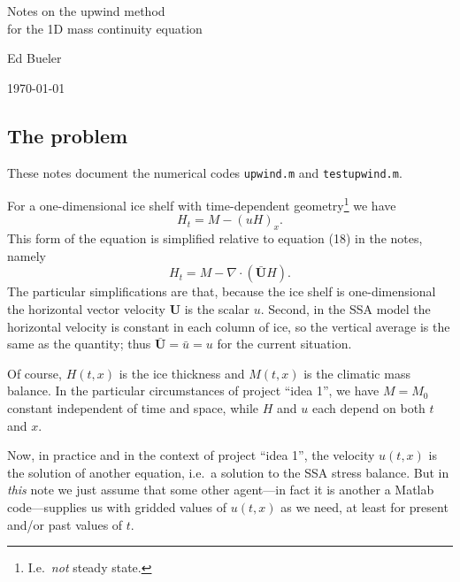 \documentclass[titlepage,a4paper,final,12pt]{scrartcl}
\newcommand{\Div}{\nabla\cdot}
\begin{document}


\begin{titlepage}

  \begin{center}
    \vspace{10cm}
    {\Large{} Notes on the upwind method \\ for the 1D mass continuity equation}
    \vspace{5cm}

    {\large Ed Bueler}

    \vspace{10cm}
    {\large \today}
  \end{center}
\end{titlepage}


\subsection*{The problem}   These notes document the numerical codes \texttt{upwind.m} and \texttt{testupwind.m}.

For a one-dimensional ice shelf with time-dependent geometry\footnote{I.e.~\emph{not} steady state.} we have
\begin{equation}
  H_t = M - (u H)_x.  \label{mc}
\end{equation}
This form of the equation is simplified relative to equation (18) in the notes, namely
    $$H_t = M - \Div \left(\bar{\mathbf{U}} H\right).$$
The particular simplifications are that, because the ice shelf is one-dimensional the horizontal vector velocity $\mathbf{U}$ is the scalar $u$.  Second, in the SSA model the horizontal velocity is constant in each column of ice, so the vertical average is the same as the quantity; thus $\bar{\mathbf{U}} = \bar{u} = u$ for the current situation.

Of course, $H(t,x)$ is the ice thickness and $M(t,x)$ is the climatic mass balance.  In the particular circumstances of project ``idea 1'', we have $M=M_0$ constant independent of time and space, while $H$ and $u$ each depend on both $t$ and $x$.

Now, in practice and in the context of project ``idea 1'', the velocity $u(t,x)$ is the solution of another equation, i.e.~a solution to the SSA stress balance.  But in \emph{this} note we just assume that some other agent---in fact it is another a Matlab code---supplies us with gridded values of $u(t,x)$ as we need, at least for present and/or past values of $t$.
\end{document}
